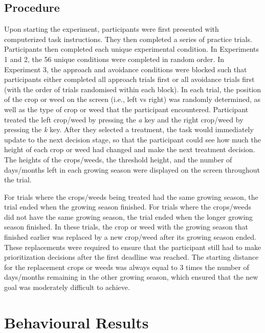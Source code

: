 \documentclass[a4paper,doc,natbib,donotrepeattitle]{apa6}
\begin{document}
\subsection{Procedure}

Upon starting the experiment, participants were first presented with computerized task instructions. They then completed a series of practice trials. Participants then completed each unique experimental condition. In Experiments 1 and 2, the 56 unique conditions were completed in random order. In Experiment 3, the approach and avoidance conditions were blocked such that participants either completed all approach trials first or all avoidance trials first (with the order of trials randomised within each block). In each trial, the position of the crop or weed on the screen (i.e., left vs right) was randomly determined, as well as the type of crop or weed that the participant encountered. Participant treated the left crop/weed by pressing the \textit{a} key and the right crop/weed by pressing the \textit{k} key. After they selected a treatment, the task would immediately update to the next decision stage, so that the participant could see how much the height of each crop or weed had changed and make the next treatment decision. The heights of the crops/weeds, the threshold height, and the number of days/months left in each growing season were displayed on the screen throughout the trial.

For trials where the crops/weeds being treated had the same growing season, the trial ended when the growing season finished. For trials where the crops/weeds did not have the same growing season, the trial ended when the longer growing season finished. In these trials, the crop or weed with the growing season that finished earlier was replaced by a new crop/weed after its growing season ended. These replacements were required to ensure that the participant still had to make prioritization decisions after the first deadline was reached. The starting distance for the replacement crops or weeds was always equal to 3 times the number of days/months remaining in the other growing season, which ensured that the new goal was moderately difficult to achieve.

\section{Behavioural Results}
\end{document}
